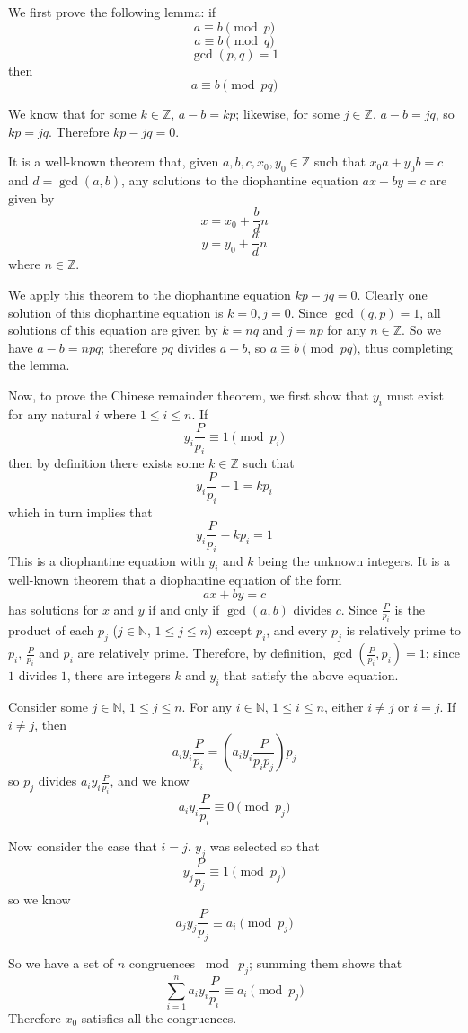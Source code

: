\documentclass[12pt]{article}
\begin{document}
We first prove the following lemma: if
\[a \equiv b \pmod{p}\]
\[a \equiv b \pmod{q}\]
\[\gcd(p,q)=1\]
then
\[a \equiv b \pmod{pq}\]

We know that for some $k \in \mathbb{Z}$, $a-b = kp$; likewise, for some $j \in \mathbb{Z}$, $a-b = jq$, so $kp = jq$.  Therefore $kp - jq = 0$.

It is a well-known theorem that, given $a,b,c,x_0,y_0 \in \mathbb{Z}$ such that $x_0a + y_0b = c$ and $d = \gcd(a,b)$, any solutions to the diophantine equation $ax + by = c$ are given by
$$x=x_0 + \frac{b}{d}n$$
$$y=y_0 + \frac{a}{d}n$$
where $n \in \mathbb{Z}$.

We apply this theorem to the diophantine equation $kp - jq = 0$.  Clearly one solution of this diophantine equation is $k = 0, j = 0$.  Since $\gcd(q,p)=1$, all solutions of this equation are given by $k=nq$ and $j=np$ for any $n \in \mathbb{Z}$.  So we have $a - b = npq$; therefore $pq$ divides $a - b$, so $a \equiv b \pmod{pq}$, thus completing the lemma.

Now, to prove the Chinese remainder theorem, we first show that $y_i$ must exist for any natural $i$ where $1 \leq i \leq n$.  If
$$y_i\frac{P}{p_i} \equiv 1 \pmod{p_i}$$
then by definition there exists some $k \in \mathbb{Z}$ such that
$$y_i\frac{P}{p_i} -1 = k p_i$$
which in turn implies that
$$y_i\frac{P}{p_i} - k p_i = 1$$
This is a diophantine equation with $y_i$ and $k$ being the unknown integers.  It is a well-known theorem that a diophantine equation of the form
$$ax + by = c$$
has solutions for $x$ and $y$ if and only if $\gcd(a,b)$ divides $c$.  Since $\frac{P}{p_i}$ is the product of each $p_j$ ($j \in \mathbb{N}$, $1 \leq j \leq n$) except $p_i$, and every $p_j$ is relatively prime to $p_i$, $\frac{P}{p_i}$ and $p_i$ are relatively prime.  Therefore, by definition, $\gcd(\frac{P}{p_i},p_i) = 1$; since $1$ divides $1$, there are integers $k$ and $y_i$ that satisfy the above equation.

Consider some $j \in \mathbb{N}$, $1 \leq j \leq n$.  For any $i \in \mathbb{N}$, $1 \leq i \leq n$, either $i\neq j$ or $i=j$.  If $i\neq j$, then
$$a_i y_i \frac{P}{p_i} = \left ( a_i y_i \frac{P}{p_i p_j} \right ) p_j$$
so $p_j$ divides $a_i y_i \frac{P}{p_i}$, and we know
$$a_i y_i \frac{P}{p_i} \equiv 0 \pmod{p_j}$$

Now consider the case that $i=j$.  $y_j$ was selected so that
$$y_j\frac{P}{p_j} \equiv 1 \pmod{p_j}$$
so we know
$$a_j y_j\frac{P}{p_j} \equiv a_i \pmod{p_j}$$

So we have a set of $n$ congruences $\bmod\ p_j$; summing them shows that
$$\sum_{i=1}^n a_i y_i \frac{P}{p_i} \equiv a_i \pmod{p_j}$$
Therefore $x_0$ satisfies all the congruences.
\end{document}
